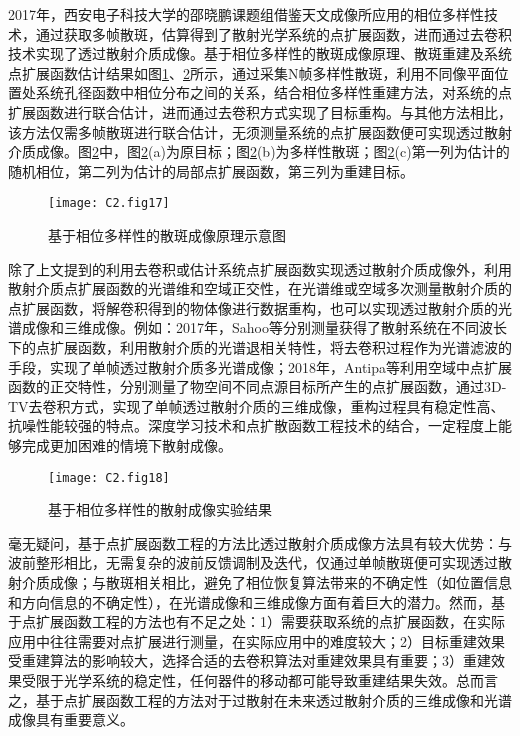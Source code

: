 2017年，西安电子科技大学的邵晓鹏课题组\cite{wu_imaging_2017}借鉴天文成像所应用的相位多样性技术，通过获取多帧散斑，估算得到了散射光学系统的点扩展函数，进而通过去卷积技术实现了透过散射介质成像。基于相位多样性的散斑成像原理、散斑重建及系统点扩展函数估计结果如图\ref{fig2:17}、\ref{fig2:18}所示，通过采集N帧多样性散斑，利用不同像平面位置处系统孔径函数中相位分布之间的关系，结合相位多样性重建方法，对系统的点扩展函数进行联合估计，进而通过去卷积方式实现了目标重构。与其他方法相比，该方法仅需多帧散斑进行联合估计，无须测量系统的点扩展函数便可实现透过散射介质成像。图\ref{fig2:18}中，图\ref{fig2:18}(a)为原目标；图\ref{fig2:18}(b)为多样性散斑；图\ref{fig2:18}(c)第一列为估计的随机相位，第二列为估计的局部点扩展函数，第三列为重建目标。

\begin{figure}[htp]
	\centering
	\texttt{[image: C2.fig17]}
	\caption{基于相位多样性的散斑成像原理示意图\cite{wu_imaging_2017}}
	\label{fig2:17}
\end{figure}

除了上文提到的利用去卷积或估计系统点扩展函数实现透过散射介质成像外，利用散射介质点扩展函数的光谱维和空域正交性，在光谱维或空域多次测量散射介质的点扩展函数，将解卷积得到的物体像进行数据重构，也可以实现透过散射介质的光谱成像和三维成像。例如：2017年，Sahoo等\cite{sahoo_single-shot_2017}分别测量获得了散射系统在不同波长下的点扩展函数，利用散射介质的光谱退相关特性，将去卷积过程作为光谱滤波的手段，实现了单帧透过散射介质多光谱成像；2018年，Antipa等\cite{antipa_diffusercam_2018}利用空域中点扩展函数的正交特性，分别测量了物空间不同点源目标所产生的点扩展函数，通过3D-TV去卷积方式，实现了单帧透过散射介质的三维成像，重构过程具有稳定性高、抗噪性能较强的特点。深度学习技术和点扩散函数工程技术的结合\cite{yanny_deep_2022}，一定程度上能够完成更加困难的情境下散射成像。

\begin{figure}[htp]
	\centering
	\texttt{[image: C2.fig18]}
	\caption{基于相位多样性的散射成像实验结果\cite{wu_imaging_2017}}
	\label{fig2:18}
\end{figure}

毫无疑问，基于点扩展函数工程的方法比透过散射介质成像方法具有较大优势：与波前整形相比，无需复杂的波前反馈调制及迭代，仅通过单帧散斑便可实现透过散射介质成像；与散斑相关相比，避免了相位恢复算法带来的不确定性（如位置信息和方向信息的不确定性），在光谱成像和三维成像方面有着巨大的潜力。然而，基于点扩展函数工程的方法也有不足之处：1）需要获取系统的点扩展函数，在实际应用中往往需要对点扩展进行测量，在实际应用中的难度较大；2）目标重建效果受重建算法的影响较大，选择合适的去卷积算法对重建效果具有重要；3）重建效果受限于光学系统的稳定性，任何器件的移动都可能导致重建结果失效。总而言之，基于点扩展函数工程的方法对于过散射在未来透过散射介质的三维成像和光谱成像具有重要意义。

